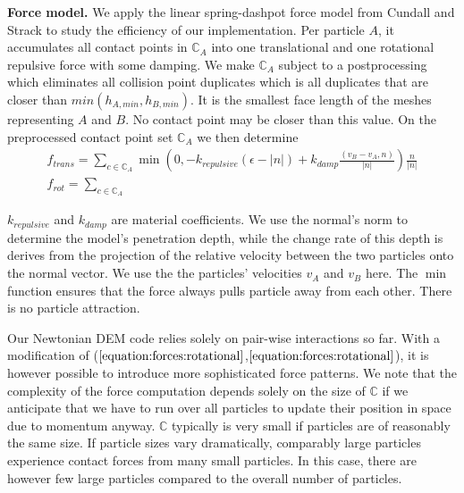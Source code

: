 {\bf Force model.}
We apply the linear spring-dashpot force model from Cundall and
Strack \cite{cundall-strack-79} to study the efficiency of our implementation.
Per particle $A$, it accumulates all contact points in $\mathbb{C}_A$ into one
translational and one rotational repulsive force with some damping.
We make $\mathbb{C}_A$ subject to a postprocessing which eliminates all
collision point duplicates which is all duplicates that are closer than
$min(h_{A,min},h_{B,min})$. 
It is the smallest face length of the meshes representing $A$ and $B$.
No contact point may be closer than this value.
On the preprocessed contact point set $\mathbb{C}_A$ we then determine
\begin{eqnarray}
  f_{trans} = \sum _{c \in \mathbb{C}_A} 
  \min \left( 0, -k_{repulsive} (\epsilon - |n|) + k_{damp}
  \frac{(v_B-v_A,n)}{|n|}  \right) \frac{n}{|n|}
  \label{equation:forces:translational}
  \\
  f_{rot} = \sum _{c \in \mathbb{C}_A}
  \label{equation:forces:rotational}
\end{eqnarray}

\noindent
$k_{repulsive}$ and $k_{damp}$ are material coefficients. 
We use the normal's norm to determine the model's penetration depth, while the
change rate of this depth is derives from the projection of the relative
velocity between the two particles onto the normal vector.
We use the the particles' velocities $v_A$ and $v_B$ here.
The $\min $ function ensures that the force always pulls particle away from each
other. There is no particle attraction.

Our Newtonian DEM code relies solely on pair-wise interactions so far. 
With a modification of
($\ref{equation:forces:rotational}$,$\ref{equation:forces:rotational}$), it is
however possible to introduce more sophisticated force patterns.
We note that the complexity of the force computation depends solely on the size
of $\mathbb{C}$ if we anticipate that we have to run over all particles to
update their position in space due to momentum anyway.
$\mathbb{C}$ typically is very small if particles are of reasonably the same
size. 
If particle sizes vary dramatically, comparably large particles experience
contact forces from many small particles.
In this case, there are however few large particles compared to the overall
number of particles.


